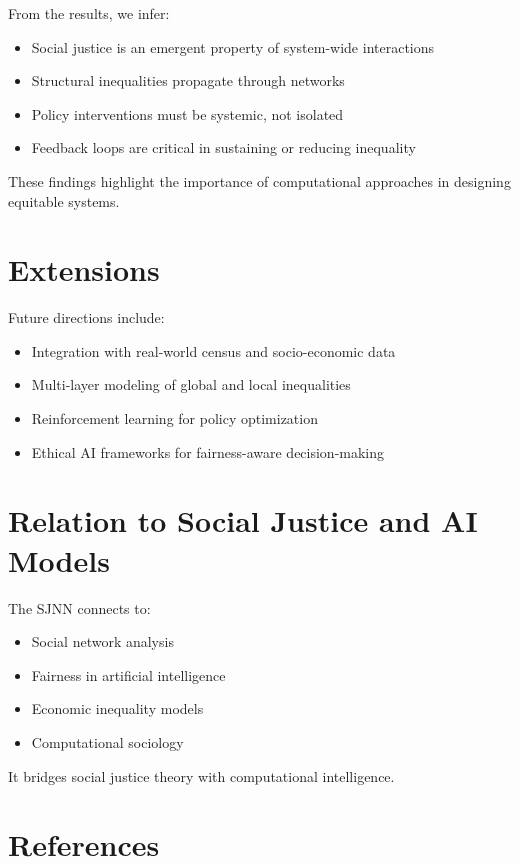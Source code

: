 \documentclass[12pt]{article}
\begin{document}
From the results, we infer:

\begin{itemize}
\item Social justice is an emergent property of system-wide interactions
\item Structural inequalities propagate through networks
\item Policy interventions must be systemic, not isolated
\item Feedback loops are critical in sustaining or reducing inequality
\end{itemize}

These findings highlight the importance of computational approaches in designing equitable systems.

\section{Extensions}

Future directions include:

\begin{itemize}
\item Integration with real-world census and socio-economic data
\item Multi-layer modeling of global and local inequalities
\item Reinforcement learning for policy optimization
\item Ethical AI frameworks for fairness-aware decision-making
\end{itemize}

\section{Relation to Social Justice and AI Models}

The SJNN connects to:

\begin{itemize}
\item Social network analysis
\item Fairness in artificial intelligence
\item Economic inequality models
\item Computational sociology
\end{itemize}

It bridges social justice theory with computational intelligence.

\section{References}
\end{document}
